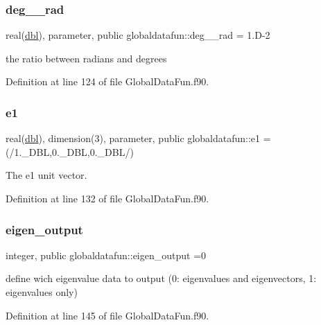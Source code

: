 \subsubsection{\texorpdfstring{deg\+\_\+\_\+rad}{deg\_2\_rad}}
{\footnotesize\ttfamily real(\hyperlink{namespaceglobaldatafun_a5008801201dd34f2af8eae07756befb4}{dbl}), parameter, public globaldatafun\+::deg\+\_\+\_\+rad = 1.\+D-\/2}



the ratio between radians and degrees 



Definition at line 124 of file Global\+Data\+Fun.\+f90.

\mbox{\label{namespaceglobaldatafun_ae724ce0d8db999ac46505601fee29b3a}} 
\subsubsection{\texorpdfstring{e1}{e1}}
{\footnotesize\ttfamily real(\hyperlink{namespaceglobaldatafun_a5008801201dd34f2af8eae07756befb4}{dbl}), dimension(3), parameter, public globaldatafun\+::e1 =(/1.\+\_\+\+D\+BL,0.\+\_\+\+D\+BL,0.\+\_\+\+D\+BL/)}



The e1 unit vector. 



Definition at line 132 of file Global\+Data\+Fun.\+f90.

\mbox{\label{namespaceglobaldatafun_a312b192a05c2e5b3dd301528abdba07c}} 
\subsubsection{\texorpdfstring{eigen\+\_\+output}{eigen\_output}}
{\footnotesize\ttfamily integer, public globaldatafun\+::eigen\+\_\+output =0}



define wich eigenvalue data to output (0\+: eigenvalues and eigenvectors, 1\+: eigenvalues only) 



Definition at line 145 of file Global\+Data\+Fun.\+f90.

